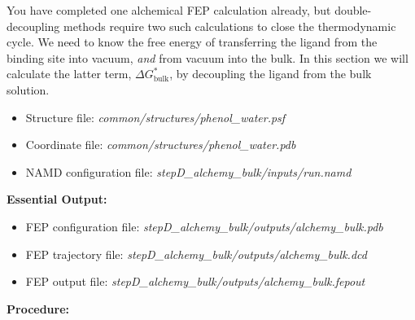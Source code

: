 \documentclass[9pt,tutorial,pubversion]{Styling/livecoms}
\newcommand{\filepath}[1]{\textit{#1}}
\begin{document}
\label{step:bulkDecoupling}
    \begin{tcolorbox}[colback=blue!5!white,colframe=blue!75!black]
    You have completed one alchemical FEP calculation already, but double-decoupling methods require two such calculations to close the thermodynamic cycle. We need to know the free energy of transferring the ligand from the binding site into vacuum, {\it and} from vacuum into the bulk.  In this section we will calculate the latter term, $\Delta G_\mathrm{bulk}^*$, by decoupling the ligand from the bulk solution. 
    \end{tcolorbox}
    \begin{itemize}
        \item Structure file: \filepath{common/structures/phenol\_water.psf} 
        \item Coordinate file: \filepath{common/structures/phenol\_water.pdb}
        \item NAMD configuration file: \filepath{stepD\_alchemy\_bulk/inputs/run.namd}
    \end{itemize}
    \textbf{Essential Output:}
    \begin{itemize}
        \item FEP configuration file: \filepath{stepD\_alchemy\_bulk/outputs/alchemy\_bulk.pdb}
        \item FEP trajectory file: \filepath{stepD\_alchemy\_bulk/outputs/alchemy\_bulk.dcd}
        \item FEP output file: \filepath{stepD\_alchemy\_bulk/outputs/alchemy\_bulk.fepout}
    \end{itemize}
    \textbf{Procedure:}
\end{document}
